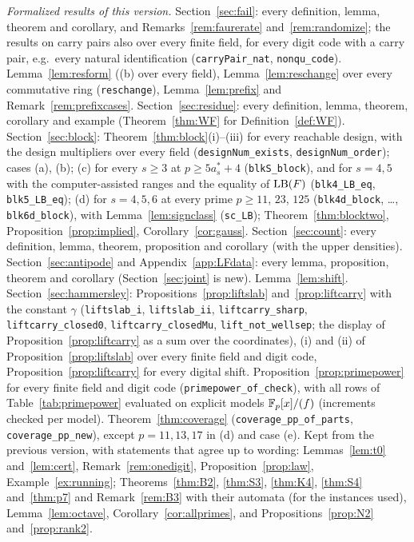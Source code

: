 \emph{Formalized results of this version.} Section~\ref{sec:fail}: every definition, lemma, theorem and corollary, and Remarks~\ref{rem:faurerate} and~\ref{rem:randomize}; the results on carry pairs also over every finite field, for every digit code with a carry pair, e.g.\ every natural identification (\texttt{carryPair\_nat}, \texttt{nonqu\_code}). Lemma~\ref{lem:resform} ((b) over every field), Lemma~\ref{lem:reschange} over every commutative ring (\texttt{reschange}), Lemma~\ref{lem:prefix} and Remark~\ref{rem:prefixcases}. Section~\ref{sec:residue}: every definition, lemma, theorem, corollary and example (Theorem~\ref{thm:WF} for Definition~\ref{def:WF}). Section~\ref{sec:block}: Theorem~\ref{thm:block}(i)--(iii) for every reachable design, with the design multipliers over every field (\texttt{designNum\_exists}, \texttt{designNum\_order}); cases (a), (b); (c) for every $s\ge3$ at $p\ge5a^*_s+4$ (\texttt{blkS\_block}), and for $s=4,5$ with the computer-assisted ranges and the equality of $\mathrm{LB}(F)$ (\texttt{blk4\_LB\_eq}, \texttt{blk5\_LB\_eq}); (d) for $s=4,5,6$ at every prime $p\ge11$, $23$, $125$ (\texttt{blk4d\_block}, \dots, \texttt{blk6d\_block}), with Lemma~\ref{lem:signclass} (\texttt{sc\_LB}); Theorem~\ref{thm:blocktwo}, Proposition~\ref{prop:implied}, Corollary~\ref{cor:gauss}. Section~\ref{sec:count}: every definition, lemma, theorem, proposition and corollary (with the upper densities). Section~\ref{sec:antipode} and Appendix~\ref{app:LFdata}: every lemma, proposition, theorem and corollary (Section~\ref{sec:joint} is new). Lemma~\ref{lem:shift}. Section~\ref{sec:hammersley}: Propositions~\ref{prop:liftslab} and~\ref{prop:liftcarry} with the constant $\gamma$ (\texttt{liftslab\_i}, \texttt{liftslab\_ii}, \texttt{liftcarry\_sharp}, \texttt{liftcarry\_closed0}, \texttt{liftcarry\_closedMu}, \texttt{lift\_not\_wellsep}; the display of Proposition~\ref{prop:liftcarry} as a sum over the coordinates), (i) and (ii) of Proposition~\ref{prop:liftslab} over every finite field and digit code, Proposition~\ref{prop:liftcarry} for every digital shift. Proposition~\ref{prop:primepower} for every finite field and digit code (\texttt{primepower\_of\_check}), with all rows of Table~\ref{tab:primepower} evaluated on explicit models $\mathbb{F}_p[x]/(f)$ (increments checked per model). Theorem~\ref{thm:coverage} (\texttt{coverage\_pp\_of\_parts}, \texttt{coverage\_pp\_new}), except $p=11,13,17$ in (d) and case (e). Kept from the previous version, with statements that agree up to wording: Lemmas~\ref{lem:t0} and~\ref{lem:cert}, Remark~\ref{rem:onedigit}, Proposition~\ref{prop:law}, Example~\ref{ex:running}; Theorems~\ref{thm:B2}, \ref{thm:S3}, \ref{thm:K4}, \ref{thm:S4} and~\ref{thm:p7} and Remark~\ref{rem:B3} with their automata (for the instances used), Lemma~\ref{lem:octave}, Corollary~\ref{cor:allprimes}, and Propositions~\ref{prop:N2} and~\ref{prop:rank2}.

